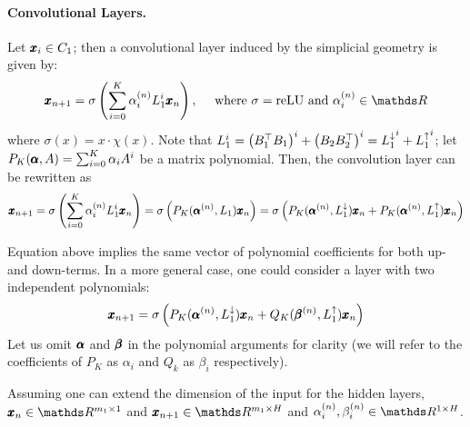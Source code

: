\documentclass{mynotes}
\begin{document}
\paragraph{ Convolutional Layers. }

Let \( \pmb{x}_i \in C_1 \); then a convolutional layer induced by the simplicial geometry is given by:
\begin{equation*}
      \b x_{n+1} = \sigma \left( \sum_{i=0}^K \alpha_i^{(n)} L_1^i \b x_n \right), \quad \text{ where } \sigma=\mathrm{reLU} \text{ and } \alpha_i^{(n)} \in \ds R
\end{equation*}
where \(\sigma ( x ) = x \cdot \chi(x) \). Note that \( L_1^i = \left( B_1^\top B_1 \right)^i + \left( B_2 B_2^\top \right)^i = {L_{1}^{\downarrow}}^i + {L_{1}^{\uparrow}}^i \); let \( P_K( \pmb{\alpha}, A ) = \sum_{i=0}^K \alpha_i A^i \) be a matrix polynomial. Then, the convolution layer can be rewritten as
\begin{equation}
      \pmb{x}_{n+1} = \sigma \left( \sum_{i=0}^K \alpha_i^{(n)} L_1^i \pmb{x}_n \right) = \sigma \left( P_K( \pmb{\alpha}^{(n)}, L_1) \pmb{x}_n \right) = \sigma \left( P_K( \pmb{\alpha}^{(n)}, L_{1}^{\downarrow}) \pmb{x}_n + P_K( \pmb{\alpha}^{(n)}, L_{1}^{\uparrow}) \pmb{x}_n  \right) 
\end{equation}
\begin{comment}
\begin{remark} 
      Given the classical definition, the layer produces the output vector \( \b x_{n+1} \) as an element of the Krylov\todo{why do we need it? who knows} subspaces spanned by the input \( \b x_n \) baring the activation function:
      \begin{equation*}
            \b x_n = \sigma \left( \b y_n \right), \qquad \b y_n \in \mc K_K (L_1, \b x_n)
      \end{equation*}
\end{remark}
\end{comment}
Equation above implies the same vector of polynomial coefficients for both up- and down-terms. In a more general case, one could consider a layer with two independent polynomials:
\begin{equation}
      \pmb{x}_{n+1} = \sigma \left( P_K( \pmb{\alpha}^{(n)}, L_{1}^{\downarrow}) \pmb{x}_n + Q_K( \pmb{\beta}^{(n)}, L_{1}^{\uparrow}) \pmb{x}_n  \right) 
\end{equation}
Let us omit \( \pmb{\alpha} \) and \( \pmb{\beta} \) in the polynomial arguments for clarity (we will refer to the coefficients of \( P_K \) as \( \alpha_i \) and \( Q_k \) as \( \beta_i \) respectively).

Assuming one can extend the dimension of the input for the hidden layers, \( \b x_n \in \ds R^{m_1 \times 1}\) and \( \b x_{n+1} \in \ds R^{m_1 \times H} \) and \( \alpha_i^{(n)}, \beta_i^{(n)} \in \ds R^{ 1 \times H } \).
\end{document}

